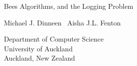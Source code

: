 

\pagestyle{empty}

\LARGE
\begin{flushleft}
Bees Algorithms, and the Logging Problem
\end{flushleft}

\normalsize
\begin{flushleft}
Michael J. Dinneen \ Aisha J.L. Fenton
\end{flushleft}

\vfill
\rmfamily
\begin{flushright}
Department of Computer Science\\
University of Auckland \\
Auckland, New Zealand 
\end{flushright}

\cleardoublepage